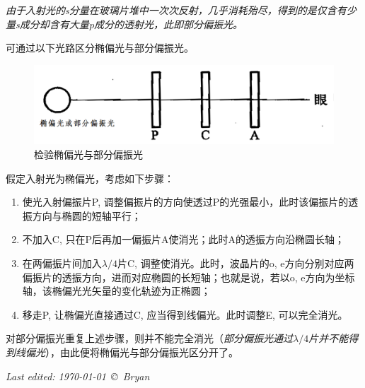 \documentclass[a4paper,10pt]{article}
\begin{document}
	\itshape 由于入射光的s分量在玻璃片堆中一次次反射，几乎消耗殆尽，得到的是仅含有少量s成分却含有大量p成分的透射光，此即部分偏振光。\normalfont
	
	可通过以下光路区分椭偏光与部分偏振光。
	\begin{figure}[!h]
	\centering
	\includegraphics[width=.7\linewidth]{identify}
	\caption{检验椭偏光与部分偏振光}
	\end{figure}\FloatBarrier
	
	假定入射光为椭偏光，考虑如下步骤：
	\begin{enumerate}
	\item 使光入射偏振片P, 调整偏振片的方向使透过P的光强最小，此时该偏振片的透振方向与椭圆的短轴平行；
	\item 不加入C, 只在P后再加一偏振片A使消光；此时A的透振方向沿椭圆长轴；
	\item 在两偏振片间加入$\lambda/4$片C, 调整使消光。此时，波晶片的o, e方向分别对应两偏振片的透振方向，进而对应椭圆的长短轴；也就是说，若以o, e方向为坐标轴，该椭偏光光矢量的变化轨迹为正椭圆；
	\item 移走P, 让椭偏光直接通过C, 应当得到线偏光。此时调整E, 可以完全消光。
	\end{enumerate}
	对部分偏振光重复上述步骤，则并不能完全消光（\textit{部分偏振光通过$\lambda/4$片并不能得到线偏光}），由此便将椭偏光与部分偏振光区分开了。
	
	\vfill\noindent\itshape\footnotesize
	\hfill Last edited: \today\ \copyright\ Bryan
\end{document}
